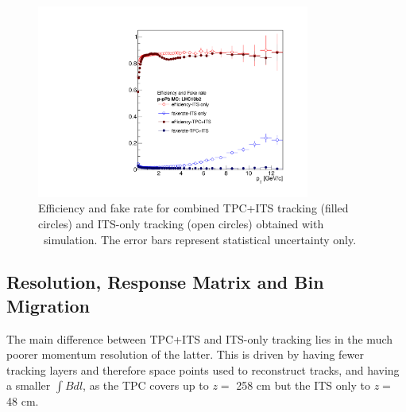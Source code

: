 \begin{figure}[h]
\center
\includegraphics[width=0.8\textwidth]{Data_Analysis/Tracking/HybridAndITS_Eff_fakerate_pPb_lowpt.pdf}
\caption{Efficiency and fake rate for combined TPC+ITS tracking (filled circles) and ITS-only tracking (open circles) obtained with \pPb~simulation. The error bars represent statistical uncertainty only.}
\label{fig:tpcEff}
\end{figure}

\FloatBarrier

\subsection{Resolution, Response Matrix and Bin Migration}
The main difference between TPC+ITS and ITS-only tracking lies in the much poorer momentum resolution of the latter. This is driven by having fewer tracking layers and therefore space points used to reconstruct tracks, and having a smaller $\int Bdl$, as the TPC covers up to {$z=$ 258 cm} but the ITS only to {$z=$ 48 cm}. 

